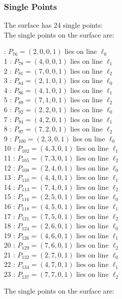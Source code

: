 \documentclass{article}
\begin{document}
{\subsubsection*{Single Points}
The surface has 24 single points:\\
The single points on the surface are:\\
\begin{multicols}{2}
 : $P_{76}=( 2, 0, 0, 1 )$ lies on line $\ell_{0}$\\
1 : $P_{78}=( 4, 0, 0, 1 )$ lies on line $\ell_{1}$\\
2 : $P_{81}=( 7, 0, 0, 1 )$ lies on line $\ell_{2}$\\
3 : $P_{84}=( 2, 1, 0, 1 )$ lies on line $\ell_{0}$\\
4 : $P_{86}=( 4, 1, 0, 1 )$ lies on line $\ell_{1}$\\
5 : $P_{89}=( 7, 1, 0, 1 )$ lies on line $\ell_{2}$\\
6 : $P_{92}=( 2, 2, 0, 1 )$ lies on line $\ell_{0}$\\
7 : $P_{94}=( 4, 2, 0, 1 )$ lies on line $\ell_{1}$\\
8 : $P_{97}=( 7, 2, 0, 1 )$ lies on line $\ell_{2}$\\
9 : $P_{100}=( 2, 3, 0, 1 )$ lies on line $\ell_{0}$\\
10 : $P_{102}=( 4, 3, 0, 1 )$ lies on line $\ell_{1}$\\
11 : $P_{105}=( 7, 3, 0, 1 )$ lies on line $\ell_{2}$\\
12 : $P_{108}=( 2, 4, 0, 1 )$ lies on line $\ell_{0}$\\
13 : $P_{110}=( 4, 4, 0, 1 )$ lies on line $\ell_{1}$\\
14 : $P_{113}=( 7, 4, 0, 1 )$ lies on line $\ell_{2}$\\
15 : $P_{116}=( 2, 5, 0, 1 )$ lies on line $\ell_{0}$\\
16 : $P_{118}=( 4, 5, 0, 1 )$ lies on line $\ell_{1}$\\
17 : $P_{121}=( 7, 5, 0, 1 )$ lies on line $\ell_{2}$\\
18 : $P_{124}=( 2, 6, 0, 1 )$ lies on line $\ell_{0}$\\
19 : $P_{126}=( 4, 6, 0, 1 )$ lies on line $\ell_{1}$\\
20 : $P_{129}=( 7, 6, 0, 1 )$ lies on line $\ell_{2}$\\
21 : $P_{132}=( 2, 7, 0, 1 )$ lies on line $\ell_{0}$\\
22 : $P_{134}=( 4, 7, 0, 1 )$ lies on line $\ell_{1}$\\
23 : $P_{137}=( 7, 7, 0, 1 )$ lies on line $\ell_{2}$\\
\end{multicols}
The single points on the surface are:\\
}
\end{document}
